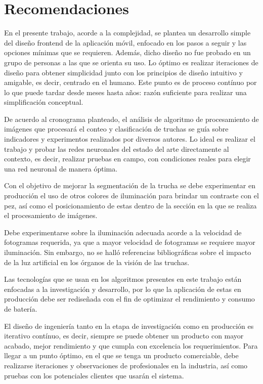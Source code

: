 
\pagestyle{myportland}
\doublespacing
\chapter*{\centering \large Recomendaciones}
\thispagestyle{myportland}

En el presente trabajo, acorde a la complejidad, se plantea un desarrollo simple del diseño frontend de la aplicación móvil, enfocado en los pasos a seguir y las opciones mínimas que se requieren. Además, dicho diseño no fue probado en un grupo de personas a las que se orienta su uso. Lo óptimo es realizar iteraciones de diseño para obtener simplicidad junto con los principios de diseño intuitivo y amigable, es decir, centrado en el humano. Este punto es de proceso contínuo por lo que puede tardar desde meses hasta años: razón suficiente para realizar una simplificación conceptual.

De acuerdo al cronograma planteado, el análisis de algoritmo de procesamiento de imágenes que procesará el conteo y clasificación de truchas se guía sobre indicadores y experimentos realizados por diversos autores. Lo ideal es realizar el trabajo y probar las redes neuronales del estado del arte directamente al contexto, es decir, realizar pruebas en campo, con condiciones reales para elegir una red neuronal de manera óptima.

Con el objetivo de mejorar la segmentación de la trucha se debe experimentar en producción el uso de otros colores de iluminación para brindar un contraste con el pez, así como el posicionamiento de estas dentro de la sección en la que se realiza el procesamiento de imágenes. 

Debe experimentarse sobre la iluminación adecuada acorde a la velocidad de fotogramas requerida, ya que a mayor velocidad de fotogramas se requiere mayor iluminación. Sin embargo, no se halló referencias bibliográficas sobre el impacto de la luz artificial en los órganos de la visión de las truchas.

Las tecnologías que se usan en los algoritmos presentes en este trabajo están enfocadas a la investigación y desarrollo, por lo que la aplicación de estas en producción debe ser rediseñada con el fin de optimizar el rendimiento y consumo de batería.

El diseño de ingeniería tanto en la etapa de investigación como en producción es iterativo contínuo, es decir, siempre se puede obtener un producto con mayor acabado, mejor rendimiento y que cumpla con excelencia los requerimientos. Para llegar a un punto óptimo, en el que se tenga un producto comerciable, debe realizarse iteraciones y observaciones de profesionales en la industria, así como pruebas con los potenciales clientes que usarán el sistema.






